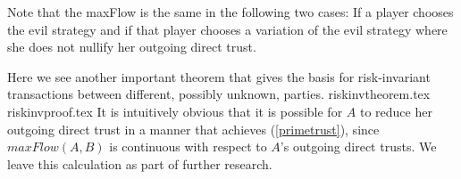    Note that the maxFlow is the same in the following two cases: If a player chooses the evil strategy and if that player
   chooses a variation of the evil strategy where she does not nullify her outgoing direct trust.

   Here we see another important theorem that gives the basis for risk-invariant transactions between different, possibly
   unknown, parties.
   {riskinvtheorem.tex}
   {riskinvproof.tex}
   It is intuitively obvious that it is possible for $A$ to reduce her outgoing direct trust in a manner that achieves
   (\ref{primetrust}), since $maxFlow\left(A, B\right)$ is continuous with respect to $A$'s outgoing direct trusts. We
   leave this calculation as part of further research.

